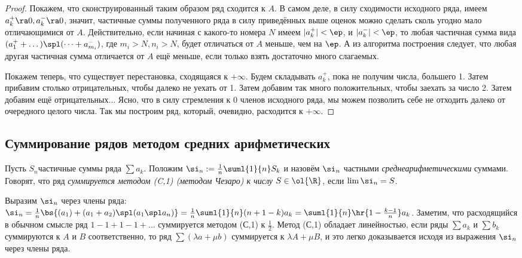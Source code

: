 \documentclass[a4paper]{article}
\begin{document}
\begin{proof}
Покажем, что сконструированный таким образом ряд сходится к $A$. В самом деле, в силу сходимости исходного ряда, имеем
$a_k^+ \ra 0, a_k^- \ra 0$, значит, частичные суммы полученного ряда в силу приведённых выше оценок можно сделать сколь угодно мало
отличающимися от $A$. Действительно, если начиная с какого-то номера $N$ имеем $|a_k^+| < \ep$, и $|a_k^-| < \ep$, то любая частичная
сумма вида $(a_1^+ + \dots)\spl (\dots + a_{m_i}^-)$, где $m_i > N, n_i > N$, будет отличаться от $A$ меньше, чем на $\ep$. А из алгоритма построения следует,
что любая другая частичная сумма отличается от $A$ ещё меньше, если только взять достаточно много слагаемых.

Покажем теперь, что существует перестановка, сходящаяся к $+\infty$. Будем складывать $a_k^+$, пока не получим числа, большего 1. Затем прибавим
столько отрицательных, чтобы далеко не уехать от 1. Затем добавим так много положительных, чтобы заехать за число 2. Затем добавим ещё отрицательных...
Ясно, что в силу стремления к 0 членов исходного ряда, мы можем позволить себе не отходить далеко от очередного целого числа. Так мы построим ряд,
который, очевидно, расходится к $+\infty$.
\end{proof}

\subsection{Суммирование рядов методом средних арифметических}

\begin{df}
Пусть $S_n$\т частичные суммы ряда $\sum a_k$. Положим $\si_n := \frac{1}{n}\suml{1}{n}S_k$ и назовём $\si_n$ частными
\emph{среднеарифметическими} суммами. Говорят, что ряд \emph{суммируется методом (C,1) (методом Чезаро) к числу} $S \in \ol{\R}$, если
$\lim \si_n=S$.
\end{df}

Выразим $\si_n$ через члены ряда: $\si_n = \frac{1}{n}\bs{(a_1) + (a_1 + a_2) \spl (a_1 \spl a_n)}=
\frac{1}{n}\suml{1}{n}(n+1-k)a_k= \suml{1}{n}\hr{1-\frac{k-1}{n}} a_k$. Заметим, что расходящийся в обычном смысле ряд
$1-1+1-1+\dots$ суммируется методом (С,1) к $\frac{1}{2}$. Метод (С,1) обладает
линейностью,  если ряды $\sum a_k$ и $\sum b_k$ суммируются к $A$ и $B$ соответственно, то ряд $\sum (\lambda a+\mu b)$ суммируется
к $\lambda A + \mu B$, и это легко доказывается исходя из выражения $\si_n$ через члены ряда.
\end{document}
